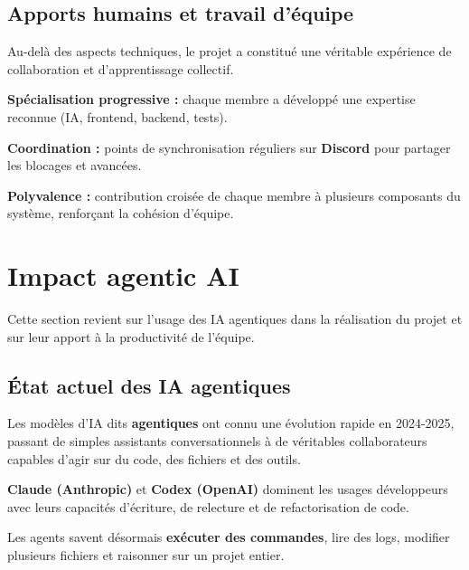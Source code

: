 \documentclass[12pt,a4paper]{article}
\newcommand{\NewMajorPart}{\clearpage}
\begin{document}
\vspace{0.15cm}

\subsection{Apports humains et travail d'équipe}

Au-delà des aspects techniques, le projet a constitué une véritable expérience
de collaboration et d'apprentissage collectif.
\begin{sq}
  \item \textbf{Spécialisation progressive :} chaque membre a développé une expertise reconnue (IA, frontend, backend, tests).
  \item \textbf{Coordination :} points de synchronisation réguliers sur \textbf{Discord} pour partager les blocages et avancées.
  \item \textbf{Polyvalence :} contribution croisée de chaque membre à plusieurs composants du système, renforçant la cohésion d'équipe.
\end{sq}

\NewMajorPart
\section{Impact agentic AI}

Cette section revient sur l'usage des IA agentiques dans la réalisation du projet
et sur leur apport à la productivité de l'équipe.

\vspace{0.15cm}

\subsection{État actuel des IA agentiques}

Les modèles d'IA dits \textbf{agentiques} ont connu une évolution rapide en 2024-2025,
passant de simples assistants conversationnels à de véritables collaborateurs capables
d'agir sur du code, des fichiers et des outils.
\begin{sq}
  \item \textbf{Claude (Anthropic)} et \textbf{Codex (OpenAI)} dominent les usages développeurs avec leurs capacités d'écriture, de relecture et de refactorisation de code.
  \item Les agents savent désormais \textbf{exécuter des commandes}, lire des logs, modifier plusieurs fichiers et raisonner sur un projet entier.
\end{sq}
\end{document}
